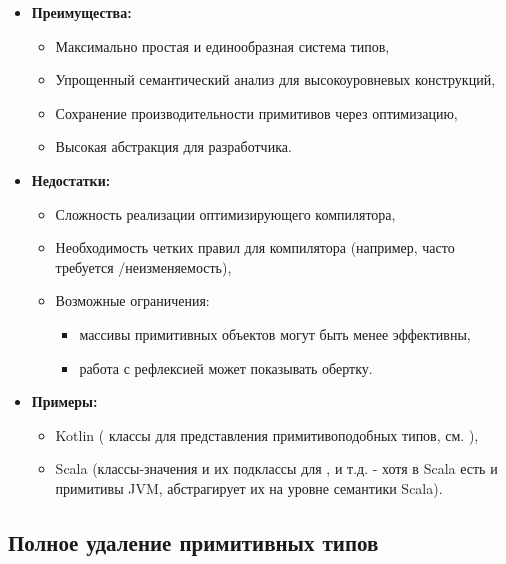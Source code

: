 \begin{itemize}[label={--}, leftmargin=*]
    \item \textbf{Преимущества:}
    \begin{itemize}[label={--}]
        \item Максимально простая и единообразная система типов,
        \item Упрощенный семантический анализ для высокоуровневых конструкций,
        \item Сохранение производительности примитивов через оптимизацию,
        \item Высокая абстракция для разработчика.
    \end{itemize}

    \item \textbf{Недостатки:}
    \begin{itemize}
        \item Сложность реализации оптимизирующего компилятора,
        \item Необходимость четких правил для компилятора (например, часто требуется /неизменяемость),
        \item Возможные ограничения:
        \begin{itemize}
            \item массивы примитивных объектов могут быть менее эффективны,
            \item работа с рефлексией может показывать обертку.
        \end{itemize}
    \end{itemize}

    \item \textbf{Примеры:}
    \begin{itemize}
        \item Kotlin ( классы для представления примитивоподобных типов, см. \cite{kotlin_doc}),
        \item Scala (классы-значения  и их подклассы для ,  и т.д. - хотя в Scala есть и примитивы JVM,  абстрагирует их на уровне семантики Scala).
    \end{itemize}
\end{itemize}



\subsection{Полное удаление примитивных типов}

